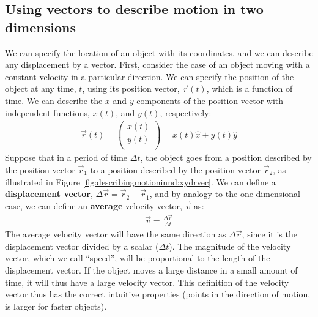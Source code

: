 \subsection{Using vectors to describe motion in two dimensions}
We can specify the location of an object with its coordinates, and we can describe any displacement by a vector. First, consider the case of an object moving with a constant velocity in a particular direction.  We can specify the position of the object at any time, $t$, using its position vector, $\vec r(t)$, which is a function of time. We can describe the $x$ and $y$ components of the position vector with independent functions, $x(t)$, and $y(t)$, respectively:
\begin{align*}
\vec r(t) = \begin{pmatrix}
           x(t) \\
           y(t) \\
         \end{pmatrix}= x(t) \hat x + y(t) \hat y
\end{align*}
Suppose that in a period of time $\Delta t$, the object goes from a position described by the position vector $\vec r_1$ to a position described by the position vector $\vec r_2$, as illustrated in Figure \ref{fig:describingmotioninnd:xydrvec}.
We can define a \textbf{displacement vector}, $\Delta \vec r=\vec r_2-\vec r_1$, and by analogy to the one dimensional case, we can define an \textbf{average} velocity vector, $\vec v$ as:
\begin{align}
\vec v = \frac{\Delta \vec r}{\Delta t}
\end{align}
The average velocity vector will have the same direction as $\Delta \vec r$, since it is the displacement vector divided by a scalar ($\Delta t$). The magnitude of the velocity vector, which we call ``speed'', will be proportional to the length of the displacement vector. If the object moves a large distance in a small amount of time, it will thus have a large velocity vector. This definition of the velocity vector thus has the correct intuitive properties (points in the direction of motion, is larger for faster objects).

